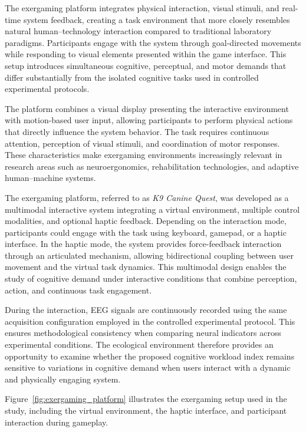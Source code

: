 \documentclass[10pt]{iopart}
\begin{document}
The exergaming platform integrates physical interaction, visual stimuli, and real-time system feedback, creating a task environment that more closely resembles natural human–technology interaction compared to traditional laboratory paradigms. Participants engage with the system through goal-directed movements while responding to visual elements presented within the game interface. This setup introduces simultaneous cognitive, perceptual, and motor demands that differ substantially from the isolated cognitive tasks used in controlled experimental protocols.

The platform combines a visual display presenting the interactive environment with motion-based user input, allowing participants to perform physical actions that directly influence the system behavior. The task requires continuous attention, perception of visual stimuli, and coordination of motor responses. These characteristics make exergaming environments increasingly relevant in research areas such as neuroergonomics, rehabilitation technologies, and adaptive human–machine systems.

The exergaming platform, referred to as \emph{K9 Canine Quest}, was developed as a multimodal interactive system integrating a virtual environment, multiple control modalities, and optional haptic feedback. Depending on the interaction mode, participants could engage with the task using keyboard, gamepad, or a haptic interface. In the haptic mode, the system provides force-feedback interaction through an articulated mechanism, allowing bidirectional coupling between user movement and the virtual task dynamics. This multimodal design enables the study of cognitive demand under interactive conditions that combine perception, action, and continuous task engagement.

During the interaction, EEG signals are continuously recorded using the same acquisition configuration employed in the controlled experimental protocol. This ensures methodological consistency when comparing neural indicators across experimental conditions. The ecological environment therefore provides an opportunity to examine whether the proposed cognitive workload index remains sensitive to variations in cognitive demand when users interact with a dynamic and physically engaging system.

Figure~\ref{fig:exergaming_platform} illustrates the exergaming setup used in the study, including the virtual environment, the haptic interface, and participant interaction during gameplay.
\end{document}
